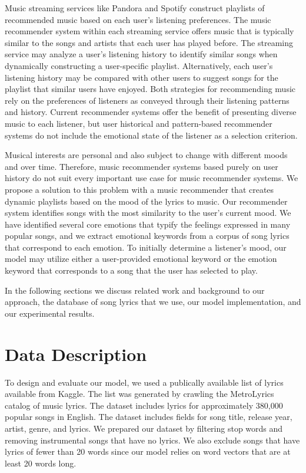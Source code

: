 \documentclass[10pt,twocolumn]{article}
\begin{document}
Music streaming services like Pandora and Spotify construct playlists of recommended music based on each user's listening preferences.  The music recommender system within each streaming service offers music that is typically similar to the songs and artists that each user has played before.  The streaming service may analyze a user's listening history to identify similar songs when dynamically constructing a user-specific playlist.  Alternatively, each user's listening history may be compared with other users to suggest songs for the playlist that similar users have enjoyed.  Both strategies for recommending music rely on the preferences of listeners as conveyed through their listening patterns and history.  Current recommender systems offer the benefit of presenting diverse music to each listener, but user historical and pattern-based recommender systems do not include the emotional state of the listener as a selection criterion.

Musical interests are personal and also subject to change with different moods and over time.  Therefore, music recommender systems based purely on user history do not suit every important use case for music recommender systems.  We propose a solution to this problem with a music recommender that creates dynamic playlists based on the mood of the lyrics to music.  Our recommender system identifies songs with the most similarity to the user's current mood.  We have identified several core emotions that typify the feelings expressed in many popular songs, and we extract emotional keywords from a corpus of song lyrics that correspond to each emotion.  To initially determine a listener's mood, our model may utilize either a user-provided emotional keyword or the emotion keyword that corresponds to a song that the user has selected to play.

In the following sections we discuss related work and background to our approach, the database of song lyrics that we use, our model implementation, and our experimental results.

\section{Data Description}
To design and evaluate our model, we used a publically available list of lyrics available from Kaggle. \cite{a14}  The list was generated by crawling the MetroLyrics catalog of music lyrics. \cite{a15}  The dataset includes lyrics for approximately 380,000 popular songs in English.  The dataset includes fields for song title, release year, artist, genre, and lyrics. We prepared our dataset by filtering stop words and removing instrumental songs that have no lyrics.  We also exclude songs that have lyrics of fewer than 20 words since our model relies on word vectors that are at least 20 words long.
\end{document}
